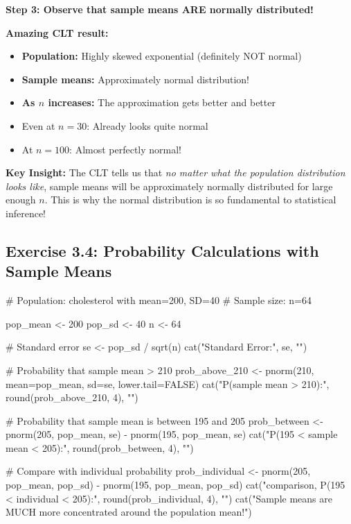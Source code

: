 \documentclass[11pt]{article}
\begin{document}
\textbf{Step 3: Observe that sample means ARE normally distributed!}

\textbf{Amazing CLT result:}
\begin{itemize}
\item \textbf{Population:} Highly skewed exponential (definitely NOT normal)
\item \textbf{Sample means:} Approximately normal distribution!
\item \textbf{As $n$ increases:} The approximation gets better and better
\item Even at $n=30$: Already looks quite normal
\item At $n=100$: Almost perfectly normal!
\end{itemize}

\vspace{0.5cm}

\textbf{Key Insight:} The CLT tells us that \textit{no matter what the population distribution looks like}, sample means will be approximately normally distributed for large enough $n$. This is why the normal distribution is so fundamental to statistical inference!

\subsection{Exercise 3.4: Probability Calculations with Sample Means}

\begin{rcode}
# Population: cholesterol with mean=200, SD=40
# Sample size: n=64

pop_mean <- 200
pop_sd <- 40
n <- 64

# Standard error
se <- pop_sd / sqrt(n)
cat("Standard Error:", se, "\n")

# Probability that sample mean > 210
prob_above_210 <- pnorm(210, mean=pop_mean, sd=se, lower.tail=FALSE)
cat("P(sample mean > 210):", round(prob_above_210, 4), "\n")

# Probability that sample mean is between 195 and 205
prob_between <- pnorm(205, pop_mean, se) - pnorm(195, pop_mean, se)
cat("P(195 < sample mean < 205):", round(prob_between, 4), "\n")

# Compare with individual probability
prob_individual <- pnorm(205, pop_mean, pop_sd) - pnorm(195, pop_mean, pop_sd)
cat("\nFor comparison, P(195 < individual < 205):",
    round(prob_individual, 4), "\n")
cat("Sample means are MUCH more concentrated around the population mean!\n")
\end{rcode}
\end{document}
